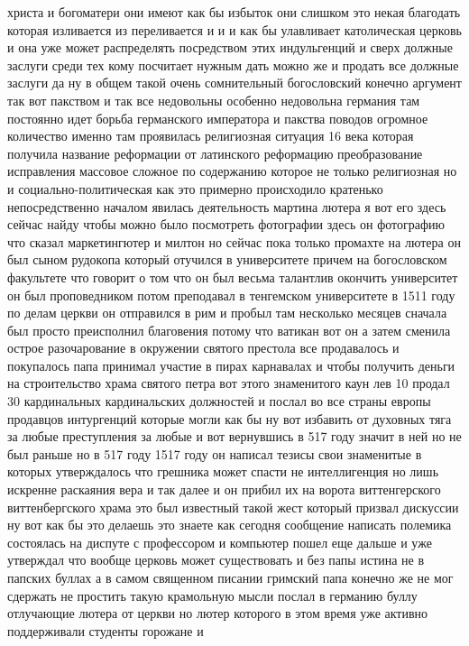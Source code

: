 христа и богоматери они имеют как бы избыток они слишком это некая благодать
которая изливается из переливается и и и как бы улавливает католическая церковь
и она уже может распределять посредством этих индульгенций и сверх должные
заслуги среди тех кому посчитает нужным дать можно же и продать все должные
заслуги да ну в общем такой очень сомнительный богословский конечно аргумент так
вот пакством и так все недовольны особенно недовольна германия там постоянно
идет борьба германского императора и пакства поводов огромное количество именно
там проявилась религиозная ситуация 16 века которая получила название реформации
от латинского реформацию преобразование исправления массовое сложное по
содержанию которое не только религиозная но и социально-политическая как это
примерно происходило кратенько непосредственно началом явилась деятельность
мартина лютера я вот его здесь сейчас найду чтобы можно было посмотреть
фотографии здесь он фотографию что сказал маркетингютер и милтон но сейчас пока
только промахте на лютера он был сыном рудокопа который отучился в университете
причем на богословском факультете что говорит о том что он был весьма талантлив
окончить университет он был проповедником потом преподавал в тенгемском
университете в 1511 году по делам церкви он отправился в рим и пробыл там
несколько месяцев сначала был просто преисполнил благовения потому что ватикан
вот он а затем сменила острое разочарование в окружении святого престола все
продавалось и покупалось папа принимал участие в пирах карнавалах и чтобы
получить деньги на строительство храма святого петра вот этого знаменитого каун
лев 10 продал 30 кардинальных кардинальских должностей и послал во все страны
европы продавцов интургенций которые могли как бы ну вот избавить от духовных
тяга за любые преступления за любые и вот вернувшись в 517 году значит в ней но
не был раньше но в 517 году 1517 году он написал тезисы свои знаменитые в
которых утверждалось что грешника может спасти не интеллигенция но лишь искренне
раскаяния вера и так далее и он прибил их на ворота виттенгерского
виттенбергского храма это был известный такой жест который призвал дискуссии ну
вот как бы это делаешь это знаете как сегодня сообщение написать полемика
состоялась на диспуте с профессором и компьютер пошел еще дальше и уже утверждал
что вообще церковь может существовать и без папы истина не в папских буллах а в
самом священном писании гримский папа конечно же не мог сдержать не простить
такую крамольную мысли послал в германию буллу отлучающие лютера от церкви но
лютер которого в этом время уже активно поддерживали студенты горожане и
